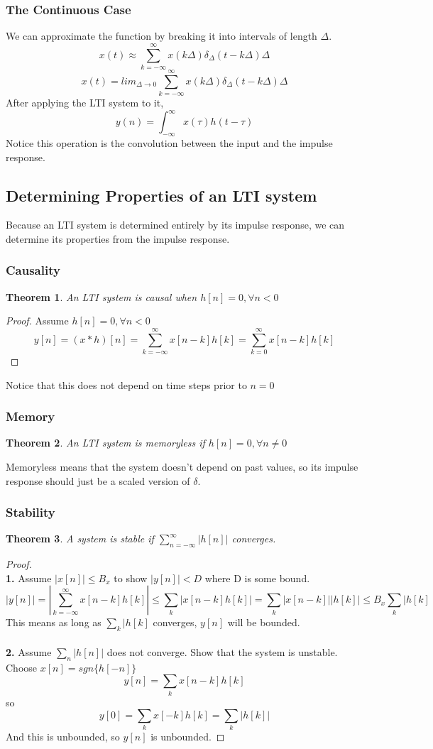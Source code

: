 \documentclass{article}
\newtheorem{theorem}{Theorem}
\newtheorem{proof}{Proof}
\begin{document}
\subsubsection{The Continuous Case}
We can approximate the function by breaking it into intervals of length $\Delta$.
$$x(t) \approx \sum_{k=-\infty}^{\infty}{x(k\Delta)\delta_{\Delta}(t-k\Delta)\Delta}$$
$$x(t) = lim_{\Delta \rightarrow 0}\sum_{k=-\infty}^{\infty}{x(k\Delta)\delta_{\Delta}(t-k\Delta)\Delta}$$
After applying the LTI system to it,
$$y(n) = \int_{-\infty}^{\infty}{x(\tau)h(t-\tau)}$$
Notice this operation is the convolution between the input and the impulse response.
\subsection{Determining Properties of an LTI system}
Because an LTI system is determined entirely by its impulse response, we can determine its properties from the impulse response.
\subsubsection{Causality}
\begin{theorem}
    An LTI system is causal when $h[n] = 0, \forall n < 0$
\end{theorem}
\begin{proof}
Assume $h[n] = 0, \forall n < 0$
$$y[n] = (x*h)[n] = \sum_{k=-\infty}^{\infty}{x[n-k]h[k]}=\sum_{k=0}^{\infty}{x[n-k]h[k]}$$
\end{proof}
Notice that this does not depend on time steps prior to $n=0$
\subsubsection{Memory}
\begin{theorem}
    An LTI system is memoryless if $h[n]=0, \forall n \ne 0$
\end{theorem}
Memoryless means that the system doesn't depend on past values, so its impulse response should
just be a scaled version of $\delta$.
\subsubsection{Stability}
\begin{theorem}
    A system is stable if $\sum_{n=-\infty}^{\infty}{|h[n]|}$ converges.
\end{theorem}
\begin{proof}
    \textbf{\\1. } Assume $|x[n]| \le B_x$ to show $|y[n]| < D$ where D is some bound.
    $$|y[n]| = |\sum_{k=-\infty}^{\infty}{x[n-k]h[k]}| \le \sum_{k}{|x[n-k]h[k]|} = \sum_{k}{|x[n-k]||h[k]|}\le B_x\sum_{k}{|h[k]}$$
    This means as long as $\sum_{k}{|h[k]}$ converges, $y[n]$ will be bounded.\\
    \textbf{\\2. } Assume $\sum_{n}{|h[n]|}$ does not converge. Show that the system is unstable.
    Choose $x[n]=sgn\{h[-n]\}$
    $$y[n]=\sum_{k}{x[n-k]h[k]}$$ so 
    $$y[0] = \sum_{k}{x[-k]h[k]} = \sum_{k}{|h[k]|}$$
    And this is unbounded, so $y[n]$ is unbounded.
\end{proof}
\end{document}
